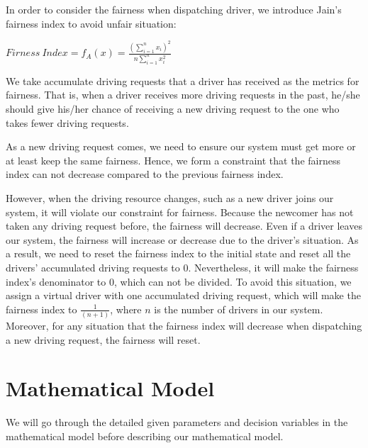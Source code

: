 In order to consider the fairness when dispatching driver, we introduce Jain's fairness index to avoid unfair situation:

$Firness\ Index = f_A(x) = \frac{\left(\sum\limits_{i=1}^{n} x_i\right)^2}{n \sum\limits_{i=1}^{n} x_i^2}$

We take accumulate driving requests that a driver has received as the metrics for fairness. That is, when a driver receives more driving requests in the past, he/she should give his/her chance of receiving a new driving request to the one who takes fewer driving requests.

As a new driving request comes, we need to ensure our system must get more or at least keep the same fairness. Hence, we form a constraint that the fairness index can not decrease compared to the previous fairness index.

However, when the driving resource changes, such as a new driver joins our system, it will violate our constraint for fairness. Because the newcomer has not taken any driving request before, the fairness will decrease. Even if a driver leaves our system, the fairness will increase or decrease due to the driver's situation. As a result, we need to reset the fairness index to the initial state and reset all the drivers' accumulated driving requests to 0. Nevertheless, it will make the fairness index's denominator to 0, which can not be divided. To avoid this situation, we assign a virtual driver with one accumulated driving request, which will make the fairness index to $\frac{1}{(n+1)}$, where $n$ is the number of drivers in our system. Moreover, for any situation that the fairness index will decrease when dispatching a new driving request, the fairness will reset.

\newpage

\section{Mathematical Model}

We will go through the detailed given parameters and decision variables in the mathematical model before describing our mathematical model.

